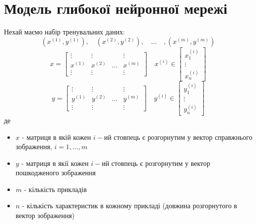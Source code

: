 \documentclass[14pt,a4paper]{extarticle}
\newcounter{e}
\numberwithin{equation}{section}
\numberwithin{figure}{section}
\newcommand{\ith}{^{(i)}}
\begin{document}
	\newpage
	\thispagestyle{empty}
	\section{Модель глибокої нейронної мережі}

	Нехай маємо набір тренувальних даних:
	\begin{equation*}
		(x^{(1)}, y^{(1)}), \quad (x^{(2)}, y^{(2)}), \quad ... \quad ,(x^{(m)}, y^{(m)})
	\end{equation*}
	\begin{equation*}
		\quad
		x =	
		\begin{bmatrix}
			\vdots  & \vdots  & & \vdots \\
			x^{(1)} & x^{(2)} &   \dots & x^{(m)}\\
			\vdots  & \vdots  & & \vdots
		\end{bmatrix}
		\quad
		x\ith \in
		\begin{bmatrix}
			x\ith_1   \\
			\vdots \\
			x\ith_n
		\end{bmatrix}
		\quad
	\end{equation*}
	\begin{equation*}
		\quad
		y =	
		\begin{bmatrix}
			\vdots  & \vdots  & & \vdots \\
			y^{(1)} & y^{(2)} &   \dots & y^{(m)}\\
			\vdots  & \vdots  & & \vdots
		\end{bmatrix}
		\quad
		y\ith \in
		\begin{bmatrix}
			y\ith_1   \\
			\vdots \\
			y\ith_n
		\end{bmatrix}
		\quad
	\end{equation*}
	де
	\begin{itemize}
		\item $x$ - матриця в якій кожен $i-$ий стовпець є розгорнутим у вектор справжнього зображення, $i=1,\dots,m$
		\item $y$ - матриця в якії кожен $i-$ий стовпець є розгорнутим у вектор пошкодженого зображення
		\item $m$ - кількість прикладів
		\item $n$ - кількість характеристик в кожному прикладі (довжина розгорнутого в вектор зображення)
	\end{itemize}
\end{document}
